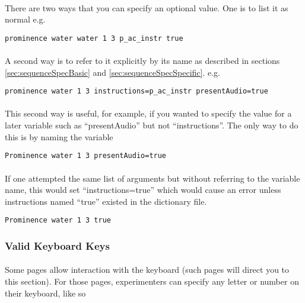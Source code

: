 \paragraph{}
There are two ways that you can specify an optional value.  One is to list it as normal e.g.

\begin{lstlisting}
prominence water water 1 3 p_ac_instr true
\end{lstlisting}

\paragraph{}
A second way is to refer to it explicitly by its name as described in sections \ref{sec:sequenceSpecBasic} and \ref{sec:sequenceSpecSpecific}. e.g.

\begin{lstlisting}
prominence water 1 3 instructions=p_ac_instr presentAudio=true
\end{lstlisting}

\paragraph{}
This second way is useful, for example, if you wanted to specify the value for a later variable such as ``presentAudio'' but not ``instructions''.  The only way to do this is by naming the variable 

\begin{lstlisting}
Prominence water 1 3 presentAudio=true
\end{lstlisting}

\paragraph{}
If one attempted the same list of arguments but without referring to the variable name, this would set ``instructions=true'' which would cause an error unless instructions named ``true'' existed in the dictionary file.

\begin{lstlisting}
Prominence water 1 3 true
\end{lstlisting}


\subsubsection{Valid Keyboard Keys}
\label{sec:validKeys}


\paragraph{}
Some pages allow interaction with the keyboard (such pages will direct you to this section).  For those pages, experimenters can specify any letter or number on their keyboard, like so

